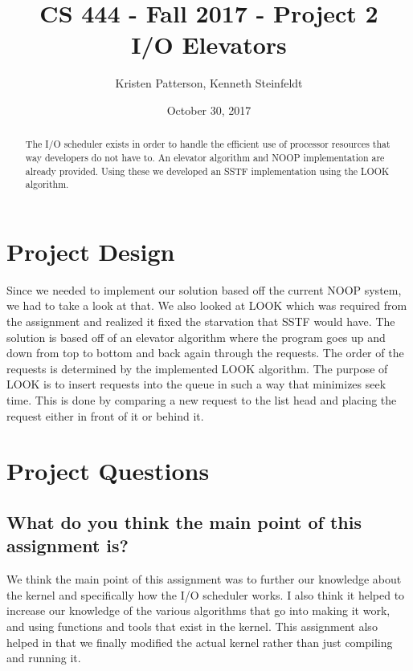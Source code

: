 \documentclass[10pt,letterpaper,onecolumn,draftclsnofoot]{IEEEtran}
\begin{document}
\begin{titlepage}

	\title{CS 444 - Fall 2017 - Project 2 \\ I/O Elevators}
	\author{Kristen Patterson, Kenneth Steinfeldt}
	\date{October 30, 2017}
	\maketitle
	\vspace{4cm}
	\begin{abstract}
		\noindent 
			\noindent
			The I/O scheduler exists in order to handle the efficient use of processor resources that way developers do not have to.
			An elevator algorithm and NOOP implementation are already provided.
			Using these we developed an SSTF implementation using the LOOK algorithm.
	\end{abstract}
\end{titlepage}

\section{Project Design}
Since we needed to implement our solution based off the current NOOP system, we had to take a look at that.
We also looked at LOOK which was required from the assignment and realized it fixed the starvation that SSTF would have.
The solution is based off of an elevator algorithm where the program goes up and down from top to bottom and back again through the requests.
The order of the requests is determined by the implemented LOOK algorithm.
The purpose of LOOK is to insert requests into the queue in such a way that minimizes seek time.
This is done by comparing a new request to the list head and placing the request either in front of it or behind it.

\section{Project Questions}
\subsection{What do you think the main point of this assignment is?}
We think the main point of this assignment was to further our knowledge about the kernel and specifically how the I/O scheduler works.
I also think it helped to increase our knowledge of the various algorithms that go into making it work, and using functions and tools that exist in the kernel.
This assignment also helped in that we finally modified the actual kernel rather than just compiling and running it.
\end{document}
